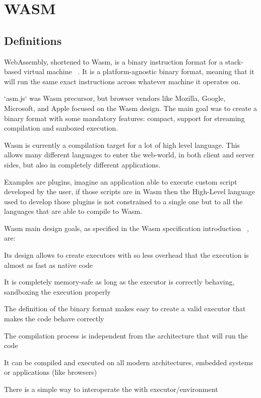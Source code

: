 \documentclass[../main.tex]{subfiles}
\begin{document}
\section{WASM}
\subsection{Definitions}

WebAssembly, shortened to Wasm, is a binary instruction format for a stack-based virtual machine ~\cite{wasm-core-spec}. It is a platform-agnostic binary format, meaning that it will run the same exact instructions across whatever machine it operates on. ~\cite{wasm-polkadot-wiki}

`asm.js` was Wasm precursor, but browser vendors like Mozilla, Google, Microsoft, and Apple focused on the Wasm design. The main goal was to create a binary format with some mandatory features: compact, support for streaming compilation and sanboxed execution.

Wasm is currently a compilation target for a lot of high level language. This allows many different languages to enter the web-world, in both client and server sides, but also in completely different applications.

Examples are plugins, imagine an application able to execute custom script developed by the user, if those scripts are in Wasm then the High-Level language used to develop those plugins is not constrained to a single one but to all the languages that are able to compile to Wasm.

Wasm main design goals, as specified in the Wasm specification introduction ~\cite{wasm-core-spec}, are:
\begin{description}[font=$\bullet$ \scshape\bfseries]
  \item[Fast] Its design allows to create executors with so less overhead that the execution is almost as fast as native code
  \item[Safe] It is completely memory-safe as long as the executor is correctly behaving, sandboxing the execution properly
  \item[Well-defined] The definition of the binary format makes easy to create a valid executor that makes the code behave correctly
  \item[Hardware-independent] The compilation process is independent from the architecture that will run the code
  \item[Platform-independent] It can be compiled and executed on all modern architectures, embedded systems or applications (like browsers)
  \item[Open] There is a simple way to interoperate the with executor/environment
\end{description}
\end{document}

